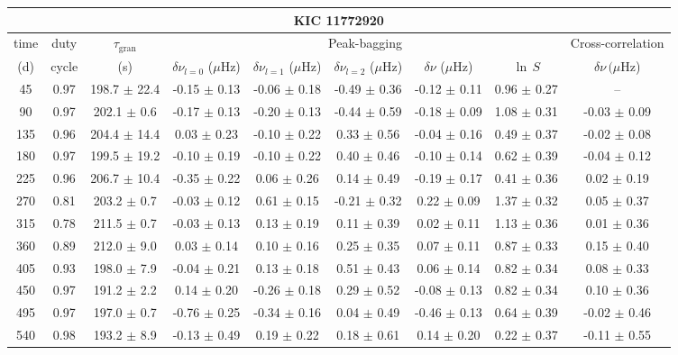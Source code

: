 \documentclass[twocolumn]{aastex61}%
\begin{document}
\begin{table*}[ht]\centering\fontsize{9.}{7.}\selectfont
\begin{tabular}{ccc|ccccc|c}
\multicolumn{9}{c}{KIC 11772920}\\ \hline\hline
time & duty & $\tau_\text{gran}$ &\multicolumn{5}{c|}{Peak-bagging}&Cross-correlation\\
(d)& cycle & (s)&$\delta\nu_{l=0}$ ($\mu$Hz) & $\delta\nu_{l=1}$ ($\mu$Hz) & $\delta\nu_{l=2}$ ($\mu$Hz) & $\delta\nu$ ($\mu$Hz)& $\ln\,S$ & $\delta\nu\,(\mu$Hz)\\\hline
45 & 0.97 & 198.7 $\pm$ 22.4 & -0.15 $\pm$ 0.13 & -0.06 $\pm$ 0.18 & -0.49 $\pm$ 0.36 & -0.12 $\pm$ 0.11 & 0.96 $\pm$ 0.27 & --\\
90 & 0.97 & 202.1 $\pm$ 0.6 & -0.17 $\pm$ 0.13 & -0.20 $\pm$ 0.13 & -0.44 $\pm$ 0.59 & -0.18 $\pm$ 0.09 & 1.08 $\pm$ 0.31 & -0.03 $\pm$ 0.09\\
135 & 0.96 & 204.4 $\pm$ 14.4 & 0.03 $\pm$ 0.23 & -0.10 $\pm$ 0.22 & 0.33 $\pm$ 0.56 & -0.04 $\pm$ 0.16 & 0.49 $\pm$ 0.37 & -0.02 $\pm$ 0.08\\
180 & 0.97 & 199.5 $\pm$ 19.2 & -0.10 $\pm$ 0.19 & -0.10 $\pm$ 0.22 & 0.40 $\pm$ 0.46 & -0.10 $\pm$ 0.14 & 0.62 $\pm$ 0.39 & -0.04 $\pm$ 0.12\\
225 & 0.96 & 206.7 $\pm$ 10.4 & -0.35 $\pm$ 0.22 & 0.06 $\pm$ 0.26 & 0.14 $\pm$ 0.49 & -0.19 $\pm$ 0.17 & 0.41 $\pm$ 0.36 & 0.02 $\pm$ 0.19\\
270 & 0.81 & 203.2 $\pm$ 0.7 & -0.03 $\pm$ 0.12 & 0.61 $\pm$ 0.15 & -0.21 $\pm$ 0.32 & 0.22 $\pm$ 0.09 & 1.37 $\pm$ 0.32 & 0.05 $\pm$ 0.37\\
315 & 0.78 & 211.5 $\pm$ 0.7 & -0.03 $\pm$ 0.13 & 0.13 $\pm$ 0.19 & 0.11 $\pm$ 0.39 & 0.02 $\pm$ 0.11 & 1.13 $\pm$ 0.36 & 0.01 $\pm$ 0.36\\
360 & 0.89 & 212.0 $\pm$ 9.0 & 0.03 $\pm$ 0.14 & 0.10 $\pm$ 0.16 & 0.25 $\pm$ 0.35 & 0.07 $\pm$ 0.11 & 0.87 $\pm$ 0.33 & 0.15 $\pm$ 0.40\\
405 & 0.93 & 198.0 $\pm$ 7.9 & -0.04 $\pm$ 0.21 & 0.13 $\pm$ 0.18 & 0.51 $\pm$ 0.43 & 0.06 $\pm$ 0.14 & 0.82 $\pm$ 0.34 & 0.08 $\pm$ 0.33\\
450 & 0.97 & 191.2 $\pm$ 2.2 & 0.14 $\pm$ 0.20 & -0.26 $\pm$ 0.18 & 0.29 $\pm$ 0.52 & -0.08 $\pm$ 0.13 & 0.82 $\pm$ 0.34 & 0.10 $\pm$ 0.36\\
495 & 0.97 & 197.0 $\pm$ 0.7 & -0.76 $\pm$ 0.25 & -0.34 $\pm$ 0.16 & 0.04 $\pm$ 0.49 & -0.46 $\pm$ 0.13 & 0.64 $\pm$ 0.39 & -0.02 $\pm$ 0.46\\
540 & 0.98 & 193.2 $\pm$ 8.9 & -0.13 $\pm$ 0.49 & 0.19 $\pm$ 0.22 & 0.18 $\pm$ 0.61 & 0.14 $\pm$ 0.20 & 0.22 $\pm$ 0.37 & -0.11 $\pm$ 0.55\\

\end{tabular}
\end{table*}
\end{document}
